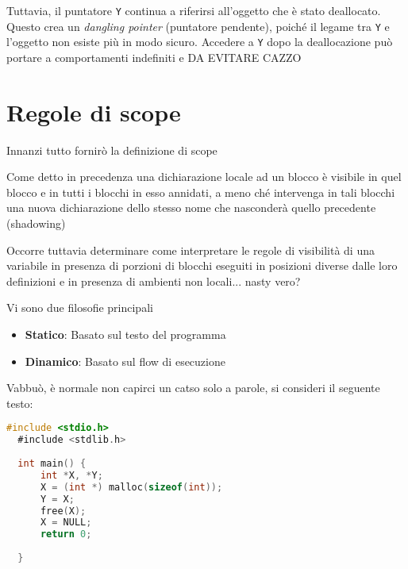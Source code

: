 \begin{itemize}
  Tuttavia, il puntatore \texttt{Y} continua a riferirsi all'oggetto  
  che è stato deallocato. Questo crea un \textit{dangling pointer} (puntatore pendente),  
  poiché il legame tra \texttt{Y} e l'oggetto non esiste più in modo sicuro.  
  Accedere a \texttt{Y} dopo la deallocazione può portare a comportamenti indefiniti e DA EVITARE CAZZO 


\end{itemize}




\section{Regole di scope}

Innanzi tutto fornirò la definizione di scope


Come detto in precedenza una dichiarazione locale ad un blocco è visibile in quel blocco e in tutti i blocchi in esso annidati, a meno ché intervenga in tali blocchi una nuova dichiarazione dello stesso nome che nasconderà quello precedente (shadowing)

Occorre tuttavia determinare come interpretare le regole di visibilità di una variabile in presenza di porzioni di blocchi eseguiti in posizioni diverse dalle loro definizioni  e in presenza di ambienti non locali... nasty vero?

Vi sono due filosofie principali
\begin{itemize}
  \item \textbf{Statico}: Basato sul testo del programma 
  \item \textbf{Dinamico}: Basato sul flow di esecuzione 
\end{itemize}

Vabbuò, è normale non capirci un catso solo a parole, si consideri il seguente testo:
\begin{lstlisting}[language=C]
  #include <stdio.h>
  #include <stdlib.h>
  
  int main() {
      int *X, *Y;
      X = (int *) malloc(sizeof(int));
      Y = X;
      free(X);
      X = NULL;
      return 0;
  
  }
\end{lstlisting}


